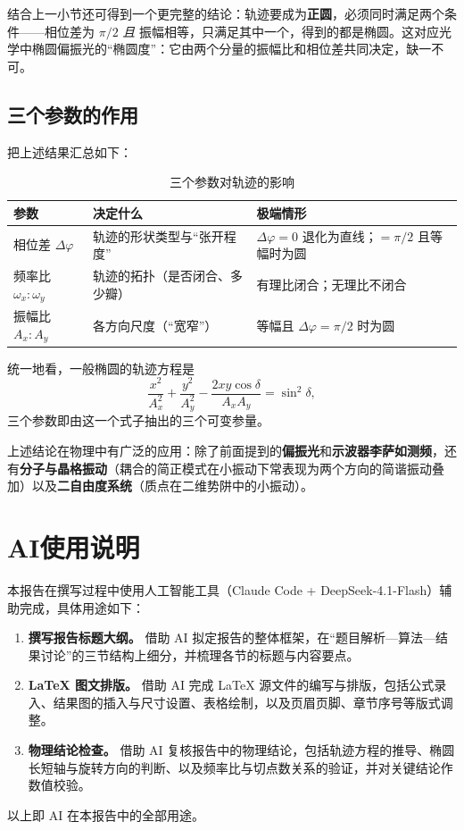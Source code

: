 \documentclass[UTF8,a4paper,12pt]{ctexart}
\begin{document}
结合上一小节还可得到一个更完整的结论：轨迹要成为\textbf{正圆}，必须同时满足两个条件——相位差为 $\pi/2$ \emph{且} 振幅相等，只满足其中一个，得到的都是椭圆。这对应光学中椭圆偏振光的“椭圆度”：它由两个分量的振幅比和相位差共同决定，缺一不可。

\subsection{三个参数的作用}

把上述结果汇总如下：

\begin{table}[H]
  \centering
  \caption{三个参数对轨迹的影响}
  \begin{tabular}{|p{3.2cm}|p{5.0cm}|p{5.4cm}|}
    \hline
    参数                       & 决定什么                       & 极端情形                                            \\
    \hline
    相位差 $\Delta\varphi$     & 轨迹的形状类型与“张开程度”     & $\Delta\varphi=0$ 退化为直线；$=\pi/2$ 且等幅时为圆 \\
    \hline
    频率比 $\omega_x:\omega_y$ & 轨迹的拓扑（是否闭合、多少瓣） & 有理比闭合；无理比不闭合                            \\
    \hline
    振幅比 $A_x:A_y$           & 各方向尺度（“宽窄”）           & 等幅且 $\Delta\varphi=\pi/2$ 时为圆                 \\
    \hline
  \end{tabular}
\end{table}

统一地看，一般椭圆的轨迹方程是
\begin{equation}
  \frac{x^{2}}{A_x^{2}}+\frac{y^{2}}{A_y^{2}}-\frac{2xy\cos\delta}{A_x A_y}=\sin^{2}\delta ,
\end{equation}
三个参数即由这一个式子抽出的三个可变参量。

上述结论在物理中有广泛的应用：除了前面提到的\textbf{偏振光}和\textbf{示波器李萨如测频}，还有\textbf{分子与晶格振动}（耦合的简正模式在小振动下常表现为两个方向的简谐振动叠加）以及\textbf{二自由度系统}（质点在二维势阱中的小振动）。

\section{AI使用说明}

本报告在撰写过程中使用人工智能工具（Claude Code + DeepSeek-4.1-Flash）辅助完成，具体用途如下：

\begin{enumerate}
  \item \textbf{撰写报告标题大纲。} 借助 AI 拟定报告的整体框架，在“题目解析—算法—结果讨论”的三节结构上细分，并梳理各节的标题与内容要点。
  \item \textbf{LaTeX 图文排版。} 借助 AI 完成 LaTeX 源文件的编写与排版，包括公式录入、结果图的插入与尺寸设置、表格绘制，以及页眉页脚、章节序号等版式调整。
  \item \textbf{物理结论检查。} 借助 AI 复核报告中的物理结论，包括轨迹方程的推导、椭圆长短轴与旋转方向的判断、以及频率比与切点数关系的验证，并对关键结论作数值校验。
\end{enumerate}

以上即 AI 在本报告中的全部用途。
\end{document}
